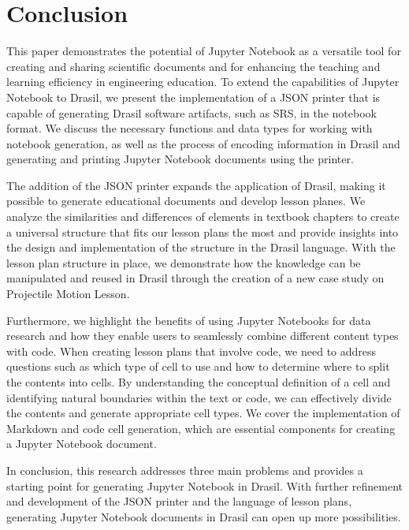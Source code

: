 \section{Conclusion}
This paper demonstrates the potential of Jupyter Notebook as a versatile 
tool for creating and sharing scientific documents and for enhancing the 
teaching and learning efficiency in engineering education. To extend the 
capabilities of Jupyter Notebook to Drasil, we present the implementation of 
a JSON printer that is capable of generating Drasil software artifacts, 
such as SRS, in the notebook format. We discuss the necessary functions and 
data types for working with notebook generation, as well as the process of 
encoding information in Drasil and generating and printing Jupyter Notebook 
documents using the printer.

The addition of the JSON printer expands the application of Drasil, making it 
possible to generate educational documents and develop lesson planes. We 
analyze the similarities and differences of elements in textbook chapters to 
create a universal structure that fits our lesson plans the most and provide 
insights into the design and implementation of the structure in the Drasil 
language. With the lesson plan structure in place, we demonstrate how the 
knowledge can be manipulated and reused in Drasil through the creation of a new 
case study on Projectile Motion Lesson. 

Furthermore, we highlight the benefits of using Jupyter Notebooks for data 
research and how they enable users to seamlessly combine different content 
types with code. When creating lesson plans that involve code, we need to 
address questions such as which type of cell to use and how to determine where 
to split the contents into cells. By understanding the conceptual definition of 
a cell and identifying natural boundaries within the text or code, we can 
effectively divide the contents and generate appropriate cell types. We cover 
the implementation of Markdown and code cell generation, which are essential 
components for creating a Jupyter Notebook document. 

In conclusion, this research addresses three main problems and provides a 
starting point for generating Jupyter Notebook in Drasil. With further 
refinement and development of the JSON printer and the language of lesson 
plans, generating Jupyter Notebook documents in Drasil can open up more 
possibilities.   